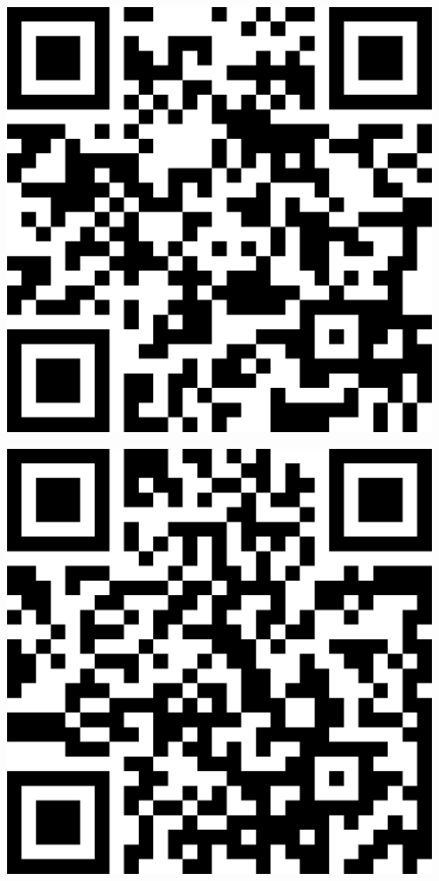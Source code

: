\documentclass[letterpaper]{article}
\begin{document}
 \endgroup 
 \vspace*{\fill} 
 \pagebreak 
{} 
 \vspace*{\fill} 
 \begingroup 
 \centerline{\includegraphics[scale=1,width=5in,height=5in]{Room4000.png}} 
 \endgroup 
 \vspace*{\fill} 
 \pagebreak 
{} 
 \vspace*{\fill} 
 \begingroup 
 \centerline{\includegraphics[scale=1,width=5in,height=5in]{Room595.png}} 
\end{document}

